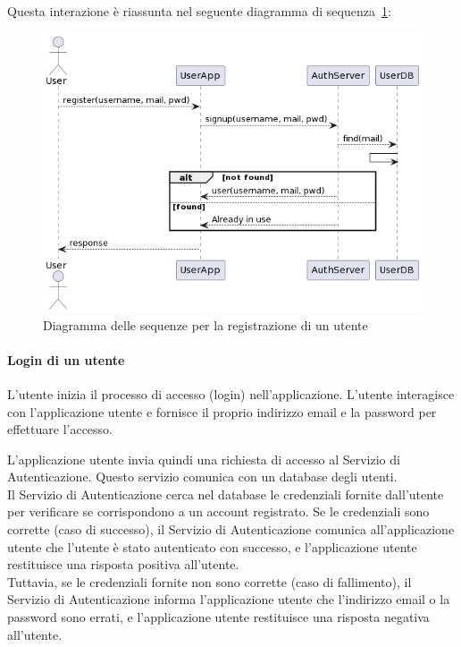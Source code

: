 Questa interazione è riassunta nel seguente diagramma di sequenza \ref{fig:signup}:
\begin{figure}[htbp]
    \centering
    \includegraphics[width=\textwidth]{images/signup.png}
    \caption{Diagramma delle sequenze per la registrazione di un utente}
    \label{fig:signup}
\end{figure}

\paragraph{Login di un utente}
L'utente inizia il processo di accesso (login) nell'applicazione. L'utente interagisce
con l'applicazione utente e fornisce il proprio indirizzo email e la password per effettuare l'accesso.

L'applicazione utente invia quindi una richiesta di accesso al Servizio di Autenticazione.
Questo servizio comunica con un database degli utenti.\\

Il Servizio di Autenticazione cerca nel database le credenziali fornite dall'utente per
verificare se corrispondono a un account registrato. Se le credenziali sono corrette
(caso di successo), il Servizio di Autenticazione comunica all'applicazione utente che
l'utente è stato autenticato con successo, e l'applicazione utente restituisce una
risposta positiva all'utente.\\

Tuttavia, se le credenziali fornite non sono corrette (caso di fallimento), il Servizio di
Autenticazione informa l'applicazione utente che l'indirizzo email o la password sono errati, e
l'applicazione utente restituisce una risposta negativa all'utente.

